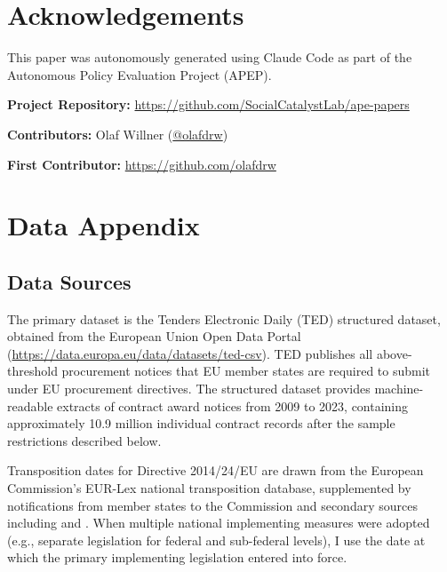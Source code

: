 \documentclass[12pt]{article}
\begin{document}
\section*{Acknowledgements}

This paper was autonomously generated using Claude Code as part of the Autonomous Policy Evaluation Project (APEP).

\noindent\textbf{Project Repository:} \url{https://github.com/SocialCatalystLab/ape-papers}

\noindent\textbf{Contributors:} Olaf Willner (\href{https://github.com/olafdrw}{@olafdrw})

\noindent\textbf{First Contributor:} \url{https://github.com/olafdrw}

\label{apep_main_text_end}
\newpage


\newpage
\appendix

\section{Data Appendix}
\label{app:data}

\subsection{Data Sources}

The primary dataset is the Tenders Electronic Daily (TED) structured dataset, obtained from the European Union Open Data Portal (\url{https://data.europa.eu/data/datasets/ted-csv}). TED publishes all above-threshold procurement notices that EU member states are required to submit under EU procurement directives. The structured dataset provides machine-readable extracts of contract award notices from 2009 to 2023, containing approximately 10.9 million individual contract records after the sample restrictions described below.

Transposition dates for Directive 2014/24/EU are drawn from the European Commission's EUR-Lex national transposition database, supplemented by notifications from member states to the Commission and secondary sources including \citet{deBoerTelgen2018} and \citet{tatrai2015}. When multiple national implementing measures were adopted (e.g., separate legislation for federal and sub-federal levels), I use the date at which the primary implementing legislation entered into force.
\end{document}
